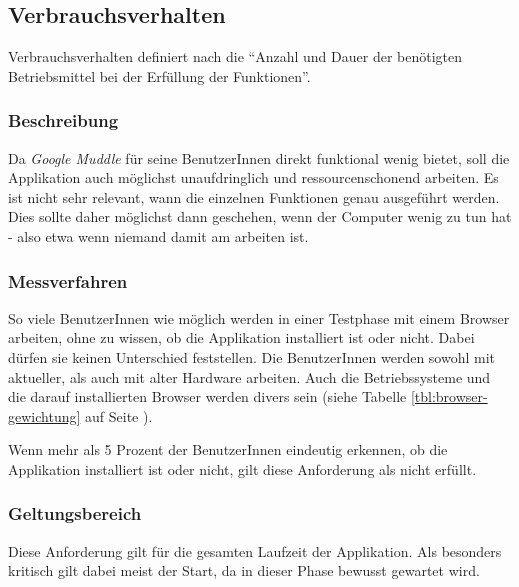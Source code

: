 \subsection{Verbrauchsverhalten}
\label{subsec:nichtfunktionale-verbrauchsverhalten}

Verbrauchsverhalten definiert nach \cite{iso:9126} die \enquote{Anzahl und Dauer
der benötigten Betriebsmittel bei der Erfüllung der Funktionen}.

\subsubsection{Beschreibung}

Da \textit{Google Muddle} für seine BenutzerInnen direkt funktional wenig
bietet, soll die Applikation auch möglichst unaufdringlich und
ressourcenschonend arbeiten. Es ist nicht sehr relevant, wann die einzelnen
Funktionen genau ausgeführt werden. Dies sollte daher möglichst dann geschehen,
wenn der Computer wenig zu tun hat - also etwa wenn niemand damit am arbeiten
ist.

\subsubsection{Messverfahren}

So viele BenutzerInnen wie möglich werden in einer Testphase mit einem Browser
arbeiten, ohne zu wissen, ob die Applikation installiert ist oder nicht. Dabei
dürfen sie keinen Unterschied feststellen. Die BenutzerInnen werden sowohl mit
aktueller, als auch mit alter Hardware arbeiten. Auch die Betriebssysteme und
die darauf installierten Browser werden divers sein (siehe Tabelle 
\ref{tbl:browser-gewichtung} auf Seite \pageref{tbl:browser-gewichtung}).

Wenn mehr als 5 Prozent der BenutzerInnen eindeutig erkennen, ob die Applikation
installiert ist oder nicht, gilt diese Anforderung als nicht erfüllt.

\subsubsection{Geltungsbereich}

Diese Anforderung gilt für die gesamten Laufzeit der Applikation. Als besonders
kritisch gilt dabei meist der Start, da in dieser Phase bewusst gewartet wird.
